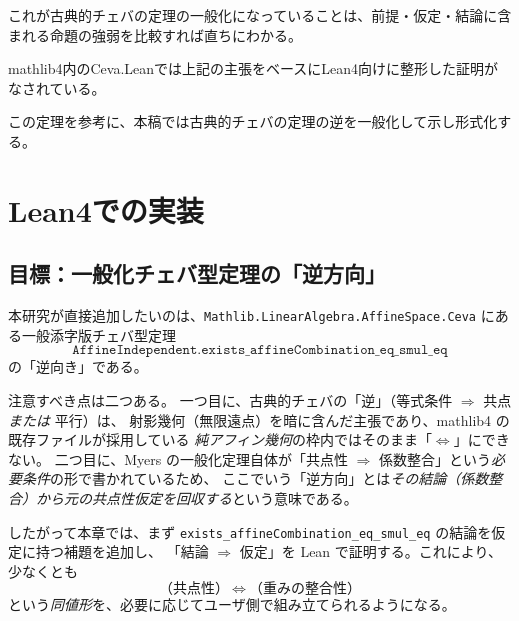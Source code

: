\documentclass[a4paper,12pt]{bxjsbook}
\newlength{\customindent}
\newenvironment{body}{
  \par
  \begingroup
  \setlength{\leftskip}{\customindent}
  \setlength{\rightskip}{0pt}
  \setlength{\parindent}{1em}
  \setlength{\displayindent}{\customindent}
  \setlength{\displaywidth}{\dimexpr\linewidth-\customindent\relax}
}{
  \par
  \endgroup
}
\theoremstyle{theorem}
\begin{document}
    \begin{body}
        \indent これが古典的チェバの定理の一般化になっていることは、前提・仮定・結論に含まれる命題の強弱を比較すれば直ちにわかる。

        \indent mathlib4内のCeva.Leanでは上記の主張をベースにLean4向けに整形した証明がなされている。

        \indent この定理を参考に、本稿では古典的チェバの定理の逆を一般化して示し形式化する。
    \end{body}

    
    \chapter{Lean4での実装}\label{ch:implementation}

    \section{目標：一般化チェバ型定理の「逆方向」}\label{sec:goal}
    \begin{body}
        \indent 本研究が直接追加したいのは、\texttt{Mathlib.LinearAlgebra.AffineSpace.Ceva} にある一般添字版チェバ型定理
        \[
          \texttt{AffineIndependent.exists\_affineCombination\_eq\_smul\_eq}
        \]
        の「逆向き」である。

        \indent 注意すべき点は二つある。
        一つ目に、古典的チェバの「逆」（等式条件 $\Rightarrow$ 共点 \emph{または} 平行）は、
        射影幾何（無限遠点）を暗に含んだ主張であり、mathlib4 の既存ファイルが採用している
        \emph{純アフィン幾何}の枠内ではそのまま「$\Leftrightarrow$」にできない。
        二つ目に、Myers の一般化定理自体が「共点性 $\Rightarrow$ 係数整合」という\emph{必要条件}の形で書かれているため、
        ここでいう「逆方向」とは\emph{その結論（係数整合）から元の共点性仮定を回収する}という意味である。

        \indent したがって本章では、まず \texttt{exists\_affineCombination\_eq\_smul\_eq} の結論を仮定に持つ補題を追加し、
        「結論 $\Rightarrow$ 仮定」を Lean で証明する。これにより、少なくとも
        \[
          \text{（共点性）} \ \Longleftrightarrow\ \text{（重みの整合性）}
        \]
        という\emph{同値形}を、必要に応じてユーザ側で組み立てられるようになる。
    \end{body}
\end{document}
